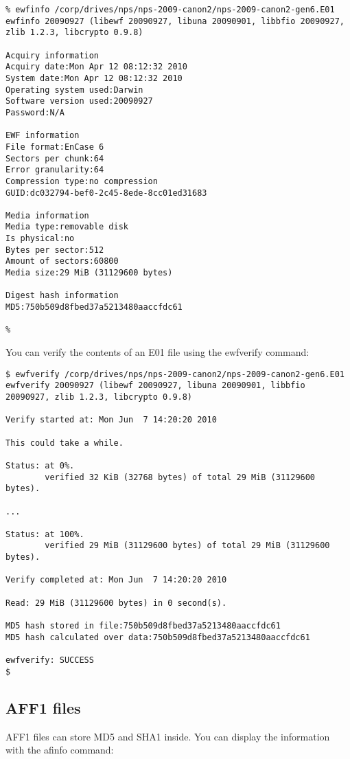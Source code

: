 \documentclass{book}
\begin{document}
\begin{Verbatim}
% ewfinfo /corp/drives/nps/nps-2009-canon2/nps-2009-canon2-gen6.E01 
ewfinfo 20090927 (libewf 20090927, libuna 20090901, libbfio 20090927, zlib 1.2.3, libcrypto 0.9.8)

Acquiry information
Acquiry date:Mon Apr 12 08:12:32 2010
System date:Mon Apr 12 08:12:32 2010
Operating system used:Darwin
Software version used:20090927
Password:N/A

EWF information
File format:EnCase 6
Sectors per chunk:64
Error granularity:64
Compression type:no compression
GUID:dc032794-bef0-2c45-8ede-8cc01ed31683

Media information
Media type:removable disk
Is physical:no
Bytes per sector:512
Amount of sectors:60800
Media size:29 MiB (31129600 bytes)

Digest hash information
MD5:750b509d8fbed37a5213480aaccfdc61

% 
\end{Verbatim}


You can verify the contents of an E01 file using the ewfverify
command:

\begin{Verbatim}
$ ewfverify /corp/drives/nps/nps-2009-canon2/nps-2009-canon2-gen6.E01 
ewfverify 20090927 (libewf 20090927, libuna 20090901, libbfio
20090927, zlib 1.2.3, libcrypto 0.9.8)

Verify started at: Mon Jun  7 14:20:20 2010

This could take a while.

Status: at 0%.
        verified 32 KiB (32768 bytes) of total 29 MiB (31129600 bytes).

...

Status: at 100%.
        verified 29 MiB (31129600 bytes) of total 29 MiB (31129600 bytes).

Verify completed at: Mon Jun  7 14:20:20 2010

Read: 29 MiB (31129600 bytes) in 0 second(s).

MD5 hash stored in file:750b509d8fbed37a5213480aaccfdc61
MD5 hash calculated over data:750b509d8fbed37a5213480aaccfdc61

ewfverify: SUCCESS
$ 
\end{Verbatim}


\subsection{AFF1 files}
AFF1 files can store MD5 and SHA1 inside. You can display the
information with the afinfo command:
\end{document}
